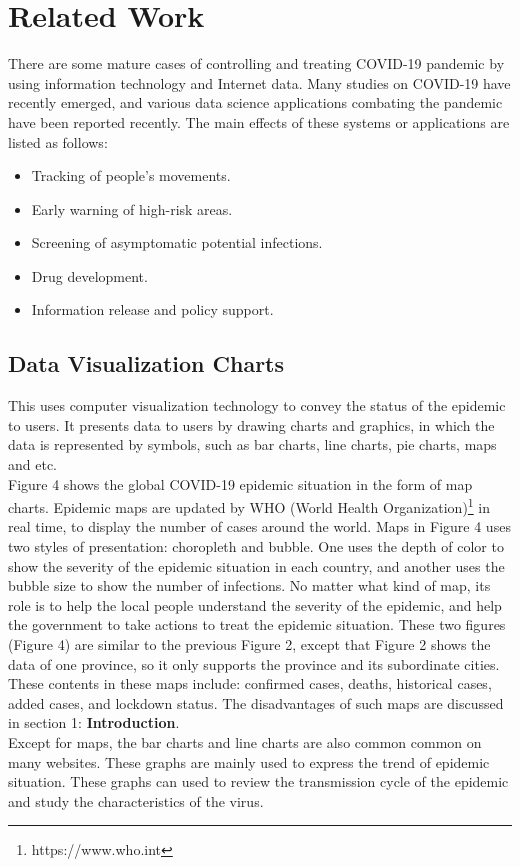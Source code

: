 \documentclass[sigplan,screen]{acmart}
\begin{document}
\section{Related Work}
There are some mature cases of controlling and treating COVID-19 pandemic by using information technology and Internet data.
Many studies on COVID-19 have recently emerged, and various data science applications combating the pandemic have been reported recently\cite{latif2020leveraging}.
The main effects of these systems or applications are listed as follows:\cite{jia2020big}
\begin{itemize}
	\item Tracking of people's movements.
	\item Early warning of high-risk areas.
	\item Screening of asymptomatic potential infections.
	\item Drug development.
	\item Information release and policy support.
\end{itemize}
\subsection{Data Visualization Charts}
This uses computer visualization technology to convey the status of the epidemic to users.
It presents data to users by drawing charts and graphics, in which the data is represented by symbols, such as bar charts, line charts, pie charts, maps and etc\cite{jensen1992harvard}.
\\
Figure 4 shows the global COVID-19 epidemic situation in the form of map charts. Epidemic maps are updated by WHO (World Health Organization)\footnote{https://www.who.int} in real time, to display the number of cases around the world.
Maps in Figure 4 uses two styles of presentation: choropleth and bubble.
One uses the depth of color to show the severity of the epidemic situation in each country, and another uses the bubble size to show the number of infections.
No matter what kind of map, its role is to help the local people understand the severity of the epidemic, and help the government to take actions to treat the epidemic situation.
These two figures (Figure 4) are similar to the previous Figure 2, except that Figure 2 shows the data of one province, so it only supports the province and its subordinate cities. These contents in these maps include: confirmed cases, deaths, historical cases, added cases, and lockdown status.
The disadvantages of such maps are discussed in section 1: \textbf{Introduction}.
\\
Except for maps, the bar charts and line charts are also common common on many websites. These graphs are mainly used to express the trend of epidemic situation.
These graphs can used to review the transmission cycle of the epidemic and study the characteristics of the virus.
\end{document}
